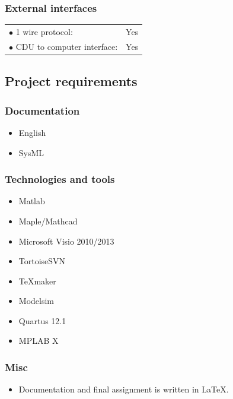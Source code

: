 \subsubsection{External interfaces}
\begin{table}[H]
\begin{tabular}{p{8cm} p{2cm}}
$\bullet$ 1 wire protocol: & Yes\\
$\bullet$ CDU to computer interface: & Yes\\
\end{tabular}
\end{table}

\subsection{Project requirements}

\subsubsection{Documentation}
\begin{itemize}
\item English
\item SysML
\end{itemize}

\subsubsection{Technologies and tools}
\begin{itemize}
\item Matlab
\item Maple/Mathcad
\item Microsoft Visio 2010/2013
\item TortoiseSVN
\item TeXmaker
\item Modelsim
\item Quartus 12.1
\item MPLAB X
\end{itemize}

\subsubsection{Misc}
\begin{itemize}
\item Documentation and final assignment is written in LaTeX.
\end{itemize}

